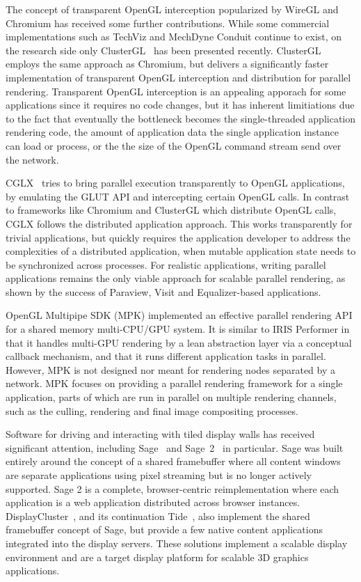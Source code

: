 The concept of transparent OpenGL interception popularized by WireGL and
Chromium has received some further contributions. While some commercial
implementations such as {TechViz} and {MechDyne Conduit} continue to exist, on
the research side only {ClusterGL}~\cite{NHM:11} has been presented recently.
{ClusterGL} employs the same approach as {Chromium}, but delivers a
significantly faster implementation of transparent OpenGL interception and
distribution for parallel rendering. Transparent OpenGL interception is an
appealing apporach for some applications since it requires no code changes, but
it has inherent limitiations due to the fact that eventually the bottleneck
becomes the single-threaded application rendering code, the amount of
application data the single application instance can load or process, or the the
size of the OpenGL command stream send over the network.

{CGLX}~\cite{DK:11} tries to bring parallel execution transparently to
OpenGL applications, by emulating the GLUT API and intercepting certain OpenGL
calls. In contrast to frameworks like {Chromium} and {ClusterGL}
which distribute OpenGL calls, {CGLX} follows the distributed application
approach. This works transparently for trivial applications, but quickly
requires the application developer to address the complexities of a distributed
application, when mutable application state needs to be synchronized across
processes. For realistic applications, writing parallel applications remains the
only viable approach for scalable parallel rendering, as shown by the success of
{Paraview}, {Visit} and {Equalizer}-based applications.

OpenGL Multipipe SDK (MPK) \cite{BRE:05} implemented an effective parallel
rendering API for a shared memory multi-CPU/GPU system. It is similar to IRIS
Performer \cite{RH:94} in that it handles multi-GPU rendering by a lean
abstraction layer via a conceptual callback mechanism, and that it runs
different application tasks in parallel. However, MPK is not designed nor meant
for rendering nodes separated by a network. MPK focuses on providing a parallel
rendering framework for a single application, parts of which are run in parallel
on multiple rendering channels, such as the culling, rendering and final image
compositing processes.

Software for driving and interacting with tiled display walls has received
significant attention, including {Sage}~\cite{Sage} and
{Sage~2}~\cite{Sage2} in particular. {Sage} was built entirely
around the concept of a shared framebuffer where all content windows are
separate applications using pixel streaming but is no longer actively supported.
{Sage 2} is a complete, browser-centric reimplementation where each
application is a web application distributed across browser instances.
{DisplayCluster}~\cite{DisplayCluster}, and its continuation
{Tide}~\cite{tide}, also implement the shared framebuffer concept of
{Sage}, but provide a few native content applications integrated into the
display servers. These solutions implement a scalable display environment and
are a target display platform for scalable 3D graphics applications.

